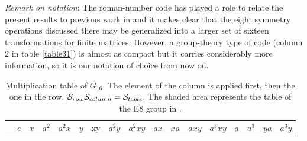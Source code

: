 {%





{\it Remark on notation}: The roman-number code has played a role to relate the present results to previous work in \cite{Ruschhaupt2017,Simon2018,Simon2019a} and it makes clear that  the eight symmetry operations discussed there may be generalized into a larger set of sixteen transformations
for finite matrices. However, a group-theory type of code (column 2 in  table \ref{table31}) is almost as compact but it carries considerably more information, so it is our notation of choice from now on.






\begin{table}[h]
\caption{Multiplication table of $G_{16}$.
The element of the  column is applied first, then  the one in the  row, ${\cal{S}}_{row}{\cal{S}}_{column}={\cal{S}}_{table}$. The shaded area represents the table of the E8 group
in \cite{Simon2018}.
 \label{tablabe}}
\vspace*{.2cm}
%
\begin{minipage}{\textwidth}
\begin{tabular}{l|llllllllllllllll}
\multicolumn{1}{l}{}&$e$
& {$x$}
& {$a^{2}$}
& {$a^{2}x$}
& {$y$}
&{xy}
& {$a^{2}y$}
& {$a^{2}xy$}
& {$ax$}
&{$xa$}
& {$axy$}
&{$a^{3}xy$}
& {$a$}
& {$a^{3}$}
& {$ya$}
& {$a^{3}y$} \\


\end{tabular}
\end{minipage}
\end{table}}
